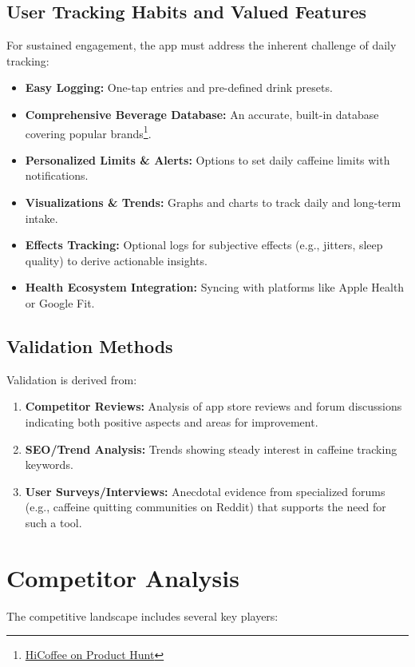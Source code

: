 \documentclass[11pt]{article}
\begin{document}
\subsection{User Tracking Habits and Valued Features}
For sustained engagement, the app must address the inherent challenge of daily tracking:
\begin{itemize}[noitemsep]
    \item \textbf{Easy Logging:} One-tap entries and pre-defined drink presets.
    \item \textbf{Comprehensive Beverage Database:} An accurate, built-in database covering popular brands\footnote{\href{https://www.producthunt.com/p/hicoffee/hicoffee}{HiCoffee on Product Hunt}}.
    \item \textbf{Personalized Limits \& Alerts:} Options to set daily caffeine limits with notifications.
    \item \textbf{Visualizations \& Trends:} Graphs and charts to track daily and long-term intake.
    \item \textbf{Effects Tracking:} Optional logs for subjective effects (e.g., jitters, sleep quality) to derive actionable insights.
    \item \textbf{Health Ecosystem Integration:} Syncing with platforms like Apple Health or Google Fit.
\end{itemize}

\subsection{Validation Methods}
Validation is derived from:
\begin{enumerate}[noitemsep]
    \item \textbf{Competitor Reviews:} Analysis of app store reviews and forum discussions indicating both positive aspects and areas for improvement.
    \item \textbf{SEO/Trend Analysis:} Trends showing steady interest in caffeine tracking keywords.
    \item \textbf{User Surveys/Interviews:} Anecdotal evidence from specialized forums (e.g., caffeine quitting communities on Reddit) that supports the need for such a tool.
\end{enumerate}

\section{Competitor Analysis}
The competitive landscape includes several key players:
\end{document}
